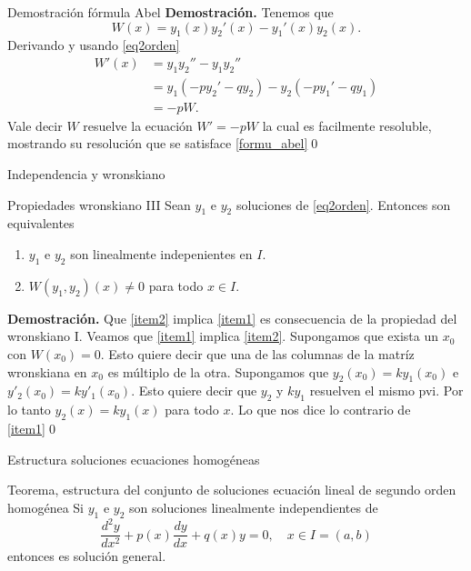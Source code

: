\documentclass[handout,hyperref={colorlinks=true}]{beamer}
\newcommand{\nl}{\onslide<+-> }
\begin{document}
\begin{frame}{Demostración fórmula Abel}
\textbf{Demostración.} Tenemos que 
\[W(x)=y_1(x)y_2'(x)-y_1'(x)y_2(x).\]
Derivando y usando \eqref{eq2orden}
\[\begin{split}W'(x)&=y_1y_2''-y_1y_2''\\
   &=y_1(-py_2'-qy_2)-y_2(-py_1'-qy_1)\\
   &=-pW.
  \end{split}
\]
Vale decir $W$ resuelve la ecuación $W'=-pW$ la cual es facilmente resoluble, mostrando su resolución que se satisface \eqref{formu_abel}\qed 


\end{frame}
 
 
\begin{frame}{Independencia y wronskiano}
\nl\begin{block}{Propiedades wronskiano III}
 Sean $y_1$ e $y_2$ soluciones de \eqref{eq2orden}. Entonces son equivalentes
 \begin{enumerate}
  \item\label{item1} $y_1$ e $y_2$ son linealmente indepenientes en $I$. 
  \item\label{item2} $W(y_1,y_2)(x)\neq 0$ para todo $x\in I$.
 \end{enumerate}
\end{block}
\nl\textbf{Demostración.}  Que \ref{item2} implica \ref{item1} es consecuencia de la propiedad del wronskiano I. 
Veamos que \ref{item1} implica \ref{item2}. Supongamos que exista un $x_0$ con $W(x_0)=0$. Esto quiere decir  que una de las columnas
de la matríz wronskiana en $x_0$ es múltiplo de la otra. Supongamos que $y_2(x_0)=ky_1(x_0)$ e $y'_2(x_0)=ky'_1(x_0)$. Esto quiere decir que $y_2$ y $ky_1$
resuelven el mismo pvi. Por lo tanto $y_2(x)=ky_1(x)$ para todo $x$. Lo que nos dice lo contrario de \ref{item1}\qed

\end{frame} 
 
\begin{frame}{Estructura soluciones ecuaciones homogéneas}
\begin{block}{Teorema, estructura del conjunto de soluciones ecuación lineal de segundo orden homogénea}
Si $y_1$ e $y_2$ son soluciones linealmente independientes de 
\[\frac{d^2y}{dx^2}+p(x)\frac{dy}{dx}+q(x)y=0,\quad x\in I=(a,b)\]
entonces
es solución general.
\end{block}

\end{frame}
\end{document}
